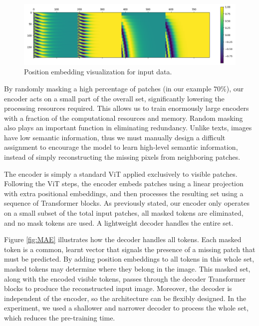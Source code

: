 \documentclass[11pt,titlepage,openright]{book}
\begin{document}
\begin{figure}[t]
  \begin{center}
    \includegraphics[width=1.0\textwidth]{Figures/pos_embed.png}
  \end{center}
  \caption{Position embedding visualization for input data.}
  \label{fig:pos_embed}
\end{figure}

By randomly masking a high percentage of patches (in our example $70\%$), our encoder acts on a small part of the overall set, significantly lowering the processing resources required. This allows us to train enormously large encoders with a fraction of the computational resources and memory. Random masking also plays an important function in eliminating redundancy. Unlike texts, images have low semantic information, thus we must manually design a difficult assignment to encourage the model to learn high-level semantic information, instead of simply reconstructing the missing pixels from neighboring patches.

The encoder is simply a standard ViT \citep{dosovitskiy2020image} applied exclusively to visible patches. Following the ViT \citep{dosovitskiy2020image} steps, the encoder embeds patches using a linear projection with extra positional embeddings, and then processes the resulting set using a sequence of Transformer blocks. As previously stated, our encoder only operates on a small subset of the total input patches, all masked tokens are eliminated, and no mask tokens are used. A lightweight decoder handles the entire set.

Figure \ref{fig:MAE} illustrates how the decoder handles all tokens. Each masked token is a common, learnt vector that signals the presence of a missing patch that must be predicted. By adding position embeddings to all tokens in this whole set, masked tokens may determine where they belong in the image. This masked set, along with the encoded visible tokens, passes through the decoder Transformer blocks to produce the reconstructed input image. Moreover, the decoder is independent of the encoder, so the architecture can be flexibly designed. In the experiment, we used a shallower and narrower decoder to process the whole set, which reduces the pre-training time.
\end{document}
